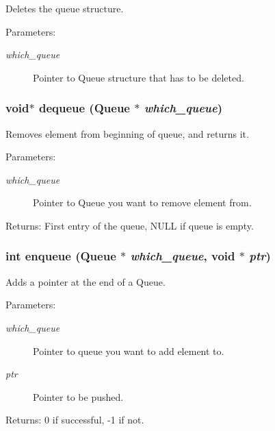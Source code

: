 Deletes the queue structure. \begin{Desc}
\item[Parameters:]
\begin{description}
\item[{\em which\_\-queue}]Pointer to Queue structure that has to be deleted. \end{description}
\end{Desc}
\subsubsection{\setlength{\rightskip}{0pt plus 5cm}void$\ast$ dequeue (\bf{Queue} $\ast$ {\em which\_\-queue})}\label{queue_8h_a150371d99ffab3f34b09efa4669a47b}


Removes element from beginning of queue, and returns it. \begin{Desc}
\item[Parameters:]
\begin{description}
\item[{\em which\_\-queue}]Pointer to Queue you want to remove element from. \end{description}
\end{Desc}
\begin{Desc}
\item[Returns:]First entry of the queue, NULL if queue is empty. \end{Desc}
\subsubsection{\setlength{\rightskip}{0pt plus 5cm}int enqueue (\bf{Queue} $\ast$ {\em which\_\-queue}, void $\ast$ {\em ptr})}\label{queue_8h_1d57a1b76a1967de5c006ed78777e65f}


Adds a pointer at the end of a Queue. \begin{Desc}
\item[Parameters:]
\begin{description}
\item[{\em which\_\-queue}]Pointer to queue you want to add element to. \item[{\em ptr}]Pointer to be pushed. \end{description}
\end{Desc}
\begin{Desc}
\item[Returns:]0 if successful, -1 if not. \end{Desc}
